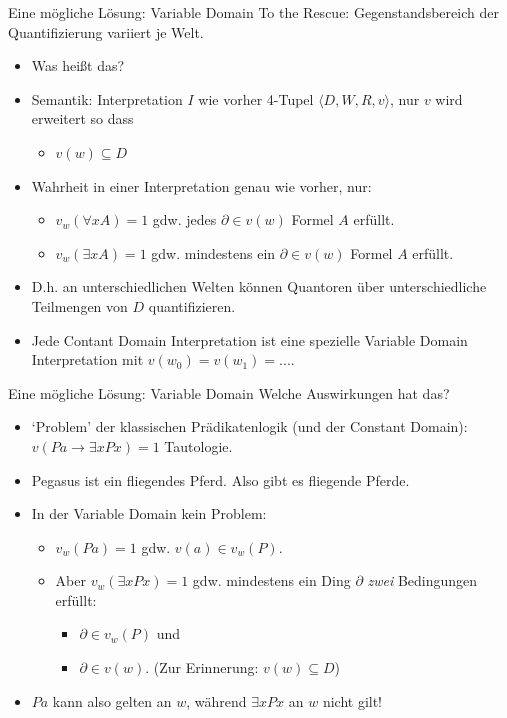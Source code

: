 \documentclass[12pt]{beamer}
\begin{document}
\begin{frame}{Eine mögliche Lösung: Variable Domain}
  To the Rescue: Gegenstandsbereich der Quantifizierung variiert je
  Welt.
  \begin{itemize}[<+->]
  \item Was heißt das?
  \item Semantik: Interpretation $I$ wie vorher 4-Tupel $\langle D, W, R, v \rangle$, nur $v$ wird erweitert so dass 
    \begin{itemize}[<+->]
    \item $v(w) \subseteq D$
    \end{itemize}
  \item Wahrheit in einer Interpretation genau wie vorher, nur:
    \begin{itemize}[<+->]
    \item $v_w(\forall x A) = 1$ gdw. jedes $\partial \in v(w)$ Formel $A$ erfüllt.
    \item $v_w(\exists x A) = 1$ gdw. mindestens ein $\partial \in v(w)$ Formel $A$ erfüllt.
    \end{itemize}
  \item D.h. an unterschiedlichen Welten können Quantoren über unterschiedliche Teilmengen von $D$ quantifizieren.
  \item Jede Contant Domain Interpretation ist eine spezielle Variable Domain Interpretation mit $v(w_0) = v(w_1) = ...$.
  \end{itemize}

\end{frame}

\begin{frame}{Eine mögliche Lösung: Variable Domain}
  Welche Auswirkungen hat das?
  \begin{itemize}[<+->]
  \item `Problem' der klassischen Prädikatenlogik (und der Constant Domain): $v(Pa \to \exists x Px) = 1$ Tautologie.
  \item Pegasus ist ein fliegendes Pferd. Also gibt es fliegende Pferde.
  \item In der Variable Domain kein Problem:
    \begin{itemize}[<+->]
    \item $v_w(Pa) = 1$ gdw. $v(a) \in v_w(P)$.
    \item Aber $v_w(\exists x Px) = 1$ gdw. mindestens ein Ding $\partial$ \emph{zwei} Bedingungen erfüllt:
      \begin{itemize}
      \item $\partial \in v_w(P)$ und
      \item $\partial \in v(w)$. (Zur Erinnerung: $v(w) \subseteq D$)
      \end{itemize}
    \end{itemize}
  \item $Pa$ kann also gelten an $w$, während $\exists x Px$ an $w$ nicht gilt!
  \end{itemize}
\end{frame}
\end{document}
